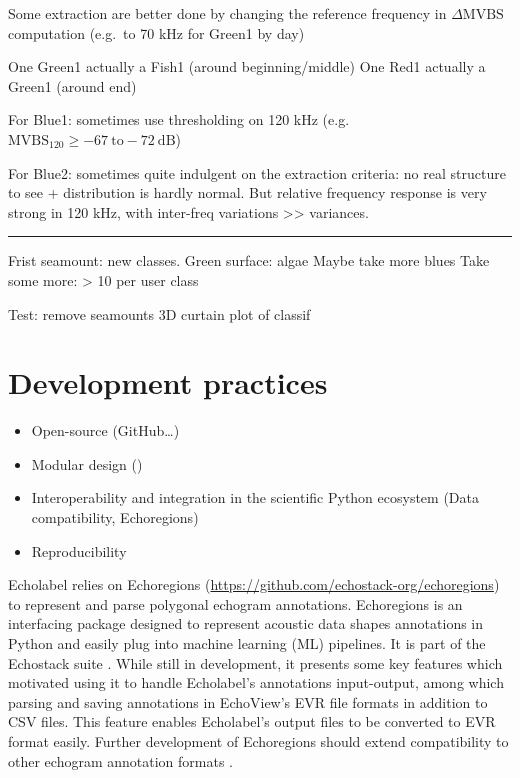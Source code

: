 \documentclass[
  10pt,
  letterpaper,
]{article}
\providecommand{\tightlist}{%
  \setlength{\itemsep}{0pt}\setlength{\parskip}{0pt}}
\begin{document}
Some extraction are better done by changing the reference frequency in
\(\Delta \text{MVBS}\) computation (e.g.~to 70 kHz for Green1 by day)

One Green1 actually a Fish1 (around beginning/middle) One Red1 actually
a Green1 (around end)

For Blue1: sometimes use thresholding on 120 kHz
(e.g.~\(\text{MVBS}_{120} \geq -67 \ \text{to} -72 \ \text{dB}\))

For Blue2: sometimes quite indulgent on the extraction criteria: no real
structure to see + distribution is hardly normal. But relative frequency
response is very strong in 120 kHz, with inter-freq variations
\textgreater\textgreater{} variances.

\begin{center}\rule{0.5\linewidth}{0.5pt}\end{center}

Frist seamount: new classes. Green surface: algae Maybe take more blues
Take some more: \textgreater{} 10 per user class

Test: remove seamounts 3D curtain plot of classif

\section{Development practices}\label{development-practices}

\begin{itemize}
\tightlist
\item
  Open-source (GitHub\ldots)
\item
  Modular design ()
\item
  Interoperability and integration in the scientific Python ecosystem
  (Data compatibility, Echoregions)
\item
  Reproducibility
\end{itemize}

Echolabel relies on Echoregions
(\url{https://github.com/echostack-org/echoregions}) to represent and
parse polygonal echogram annotations. Echoregions is an interfacing
package designed to represent acoustic data shapes annotations in Python
and easily plug into machine learning (ML) pipelines. It is part of the
Echostack suite \citep{lee2024}. While still in development, it presents
some key features which motivated using it to handle Echolabel's
annotations input-output, among which parsing and saving annotations in
EchoView's EVR file formats in addition to CSV files. This feature
enables Echolabel's output files to be converted to EVR format easily.
Further development of Echoregions should extend compatibility to other
echogram annotation formats \citep{lee2024}.
\end{document}
